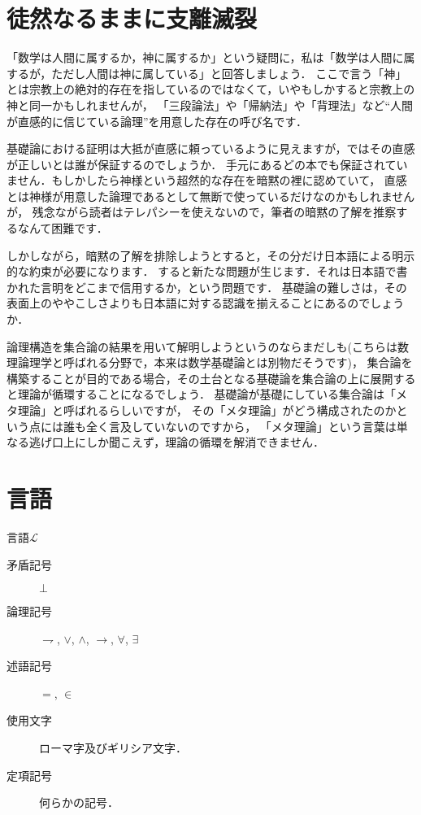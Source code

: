 \documentclass[a4j,10.5pt,oneside,openany]{jsbook}
\begin{document}

\section{徒然なるままに支離滅裂}

「数学は人間に属するか，神に属するか」という疑問に，私は「数学は人間に属するが，ただし人間は神に属している」と回答しましょう．
ここで言う「神」とは宗教上の絶対的存在を指しているのではなくて，いやもしかすると宗教上の神と同一かもしれませんが，
「三段論法」や「帰納法」や「背理法」など``人間が直感的に信じている論理''を用意した存在の呼び名です．

基礎論における証明は大抵が直感に頼っているように見えますが，ではその直感が正しいとは誰が保証するのでしょうか．
手元にあるどの本でも保証されていません．もしかしたら神様という超然的な存在を暗黙の裡に認めていて，
直感とは神様が用意した論理であるとして無断で使っているだけなのかもしれませんが，
残念ながら読者はテレパシーを使えないので，筆者の暗黙の了解を推察するなんて困難です．

しかしながら，暗黙の了解を排除しようとすると，その分だけ日本語による明示的な約束が必要になります．
すると新たな問題が生じます．それは日本語で書かれた言明をどこまで信用するか，という問題です．
基礎論の難しさは，その表面上のややこしさよりも日本語に対する認識を揃えることにあるのでしょうか．

論理構造を集合論の結果を用いて解明しようというのならまだしも(こちらは数理論理学と呼ばれる分野で，本来は数学基礎論とは別物だそうです)，
集合論を構築することが目的である場合，その土台となる基礎論を集合論の上に展開すると理論が循環することになるでしょう．
基礎論が基礎にしている集合論は「メタ理論」と呼ばれるらしいですが，
その「メタ理論」がどう構成されたのかという点には誰も全く言及していないのですから，
「メタ理論」という言葉は単なる逃げ口上にしか聞こえず，理論の循環を解消できません．

\section{言語}
	言語$\mathcal{L}$
	\begin{description}
		\item[矛盾記号] $\bot$
		\item[論理記号]  $\rightharpoondown$, $\vee$, $\wedge$, $\rightarrow$,
			$\forall$, $\exists$
		\item[述語記号] $=$, $\in$
		\item[使用文字] ローマ字及びギリシア文字．
		\item[定項記号] 何らかの記号．
	\end{description}
\end{document}
